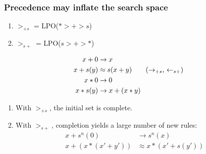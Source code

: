 \documentclass[a4paper]{beamer}
\begin{document}
\begin{frame}
\frametitle{Precedence may inflate the search space}
\begin{enumerate}
\item $>_{+s}$ = LPO($* > + > s$)
\item $>_{s+}$ = LPO($s > + > *$)
\end{enumerate}
\begin{align*}
x + 0 &\to x \\
x + s(y) &\approx s(x + y) \tag{$\to_{+s}$, $\leftarrow_{s+}$}\\
x * 0 &\to 0\\
x * s(y) &\to x + (x * y)
\end{align*}
\begin{enumerate}
\item With $>_{+s}$, the initial set is complete.
\item With $>_{s+}$, completion yields a large number of new rules:
\begin{align*}
x + s^n(0) &\to s^n(x) \tag{$\forall n \in \nat$}\\
x + (x * (x' + y')) &\approx x * (x' + s(y')) \tag{unorientable}
\end{align*}
\end{enumerate}
\end{frame}
\end{document}
